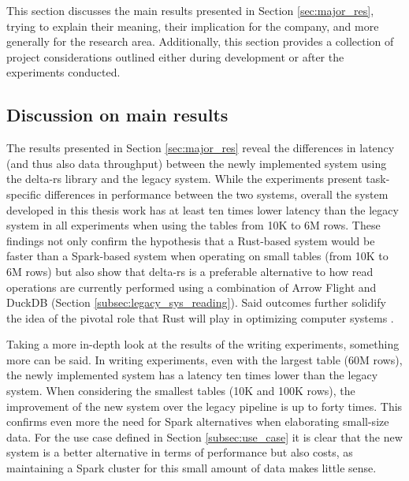 This section discusses the main results presented in Section \ref{sec:major_res}, trying to explain their meaning, their implication for the company, and more generally for the research area. Additionally, this section provides a collection of project considerations outlined either during development or after the experiments conducted.

\subsection{Discussion on main results}

The results presented in Section \ref{sec:major_res} reveal the differences in latency (and thus also data throughput) between the newly implemented system using the delta-rs library and the legacy system. While the experiments present task-specific differences in performance between the two systems, overall the system developed in this thesis work has at least ten times lower latency than the legacy system in all experiments when using the tables from 10K to 6M rows. These findings not only confirm the hypothesis that a Rust-based system would be faster than a Spark-based system when operating on small tables (from 10K to 6M rows) but also show that delta-rs is a preferable alternative to how read operations are currently performed using a combination of Arrow Flight and DuckDB (Section \ref{subsec:legacy_sys_reading}). Said outcomes further solidify the idea of the pivotal role that Rust will play in optimizing computer systems \cite{Balasub2017}.

Taking a more in-depth look at the results of the writing experiments, something more can be said. In writing experiments, even with the largest table (60M rows), the newly implemented system has a latency ten times lower than the legacy system. When considering the smallest tables (10K and 100K rows), the improvement of the new system over the legacy pipeline is up to forty times. This confirms even more the need for Spark alternatives when elaborating small-size data. For the use case defined in Section \ref{subsec:use_case} it is clear that the new system is a better alternative in terms of performance but also costs, as maintaining a Spark cluster for this small amount of data makes little sense. 

